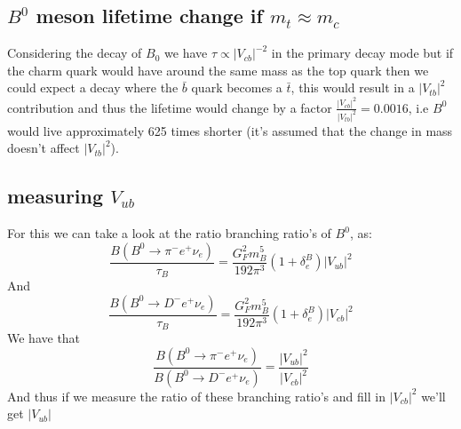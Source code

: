 \documentclass[10pt,a4paper,twoside]{article}
\begin{document}
\subsection{$B^0$ meson lifetime change if $m_t \approx m_c$}
Considering the decay of $B_0$ we have $\tau \propto |V_{cb}|^{-2}$ in the primary decay mode but if the charm quark would have around the same mass as the top quark then we could expect a decay where the $\bar{b}$ quark becomes a $\bar{t}$, this would result in a $|V_{tb}|^2$ contribution and thus the lifetime would change by a factor $\frac{|V_{cb}|^2}{|V_{tb}|^2} = 0.0016$, i.e $B^0$ would live approximately 625 times shorter (it's assumed that the change in mass doesn't affect $|V_{tb}|^2$).
\subsection{measuring $V_{ub}$}
For this we can take a look at the ratio branching ratio's of $B^0$, as:
\begin{equation}
	\frac{B\left(B^{0} \rightarrow \pi^{-} e^{+} \nu_{e}\right)}{\tau_B}=\frac{G_{F}^{2} m_{B}^{5}}{192 \pi^{3}}\left(1+\delta_{e}^{B}\right)\left|V_{u b}\right|^{2}
\end{equation}
And
\begin{equation}
\frac{B\left(B^{0} \rightarrow D^{-} e^{+} \nu_{e}\right)}{\tau_B}=\frac{G_{F}^{2} m_{B}^{5}}{192 \pi^{3}}\left(1+\delta_{e}^{B}\right)\left|V_{cb}\right|^{2}
\end{equation}
We have that
\begin{equation}
	\frac{B\left(B^{0} \rightarrow \pi^{-} e^{+} \nu_{e}\right)}{B\left(B^{0} \rightarrow D^{-} e^{+} \nu_{e}\right)} = \frac{\left|V_{u b}\right|^{2}}{\left|V_{cb}\right|^{2}}
\end{equation}
And thus if we measure the ratio of these branching ratio's and fill in $|V_{cb}|^2$ we'll get $|V_{ub}|$


\end{document}
